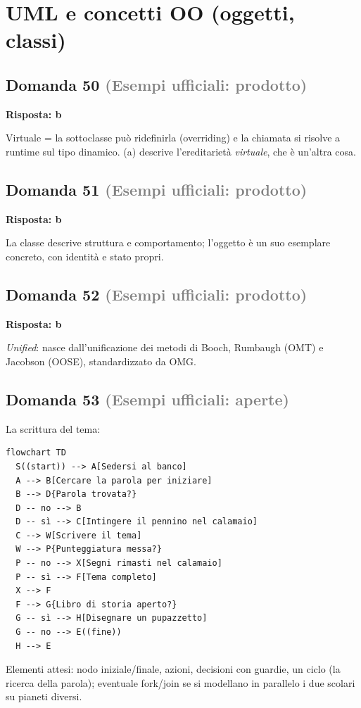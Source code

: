\documentclass[a4paper,11pt]{article}
\begin{document}
\section{UML e concetti OO (oggetti, classi)}

\subsection*{Domanda 50 \hfill {\small \textcolor{gray}{(Esempi ufficiali: prodotto)}}}
\textbf{Risposta: b}\par
Virtuale = la sottoclasse può ridefinirla (overriding) e la chiamata si risolve a runtime sul tipo dinamico. (a) descrive l'ereditarietà \textit{virtuale}, che è un'altra cosa.



\subsection*{Domanda 51 \hfill {\small \textcolor{gray}{(Esempi ufficiali: prodotto)}}}
\textbf{Risposta: b}\par
La classe descrive struttura e comportamento; l'oggetto è un suo esemplare concreto, con identità e stato propri.



\subsection*{Domanda 52 \hfill {\small \textcolor{gray}{(Esempi ufficiali: prodotto)}}}
\textbf{Risposta: b}\par
\textit{Unified}: nasce dall'unificazione dei metodi di Booch, Rumbaugh (OMT) e Jacobson (OOSE), standardizzato da OMG.



\subsection*{Domanda 53 \hfill {\small \textcolor{gray}{(Esempi ufficiali: aperte)}}}
La scrittura del tema:

\begin{verbatim}
flowchart TD
  S((start)) --> A[Sedersi al banco]
  A --> B[Cercare la parola per iniziare]
  B --> D{Parola trovata?}
  D -- no --> B
  D -- sì --> C[Intingere il pennino nel calamaio]
  C --> W[Scrivere il tema]
  W --> P{Punteggiatura messa?}
  P -- no --> X[Segni rimasti nel calamaio]
  P -- sì --> F[Tema completo]
  X --> F
  F --> G{Libro di storia aperto?}
  G -- sì --> H[Disegnare un pupazzetto]
  G -- no --> E((fine))
  H --> E
\end{verbatim}
Elementi attesi: nodo iniziale/finale, azioni, decisioni con guardie, un ciclo (la ricerca della parola); eventuale fork/join se si modellano in parallelo i due scolari su pianeti diversi.
\end{document}
